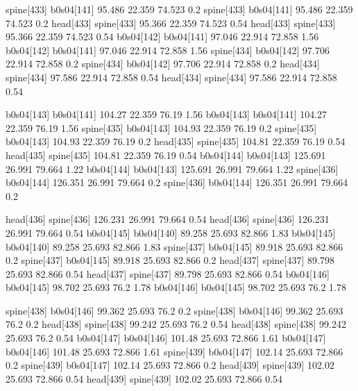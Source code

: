 spine[433]    b0s04[141]    95.486    22.359    74.523    0.2
spine[433]    b0s04[141]    95.486    22.359    74.523    0.2
head[433]    spine[433]    95.366    22.359    74.523    0.54
head[433]    spine[433]    95.366    22.359    74.523    0.54
b0s04[142]    b0s04[141]    97.046    22.914    72.858    1.56
b0s04[142]    b0s04[141]    97.046    22.914    72.858    1.56
spine[434]    b0s04[142]    97.706    22.914    72.858    0.2
spine[434]    b0s04[142]    97.706    22.914    72.858    0.2
head[434]    spine[434]    97.586    22.914    72.858    0.54
head[434]    spine[434]    97.586    22.914    72.858    0.54


b0s04[143]    b0s04[141]    104.27    22.359    76.19    1.56
b0s04[143]    b0s04[141]    104.27    22.359    76.19    1.56
spine[435]    b0s04[143]    104.93    22.359    76.19    0.2
spine[435]    b0s04[143]    104.93    22.359    76.19    0.2
head[435]    spine[435]    104.81    22.359    76.19    0.54
head[435]    spine[435]    104.81    22.359    76.19    0.54
b0s04[144]    b0s04[143]    125.691    26.991    79.664    1.22
b0s04[144]    b0s04[143]    125.691    26.991    79.664    1.22
spine[436]    b0s04[144]    126.351    26.991    79.664    0.2
spine[436]    b0s04[144]    126.351    26.991    79.664    0.2


head[436]    spine[436]    126.231    26.991    79.664    0.54
head[436]    spine[436]    126.231    26.991    79.664    0.54
b0s04[145]    b0s04[140]    89.258    25.693    82.866    1.83
b0s04[145]    b0s04[140]    89.258    25.693    82.866    1.83
spine[437]    b0s04[145]    89.918    25.693    82.866    0.2
spine[437]    b0s04[145]    89.918    25.693    82.866    0.2
head[437]    spine[437]    89.798    25.693    82.866    0.54
head[437]    spine[437]    89.798    25.693    82.866    0.54
b0s04[146]    b0s04[145]    98.702    25.693    76.2    1.78
b0s04[146]    b0s04[145]    98.702    25.693    76.2    1.78


spine[438]    b0s04[146]    99.362    25.693    76.2    0.2
spine[438]    b0s04[146]    99.362    25.693    76.2    0.2
head[438]    spine[438]    99.242    25.693    76.2    0.54
head[438]    spine[438]    99.242    25.693    76.2    0.54
b0s04[147]    b0s04[146]    101.48    25.693    72.866    1.61
b0s04[147]    b0s04[146]    101.48    25.693    72.866    1.61
spine[439]    b0s04[147]    102.14    25.693    72.866    0.2
spine[439]    b0s04[147]    102.14    25.693    72.866    0.2
head[439]    spine[439]    102.02    25.693    72.866    0.54
head[439]    spine[439]    102.02    25.693    72.866    0.54


